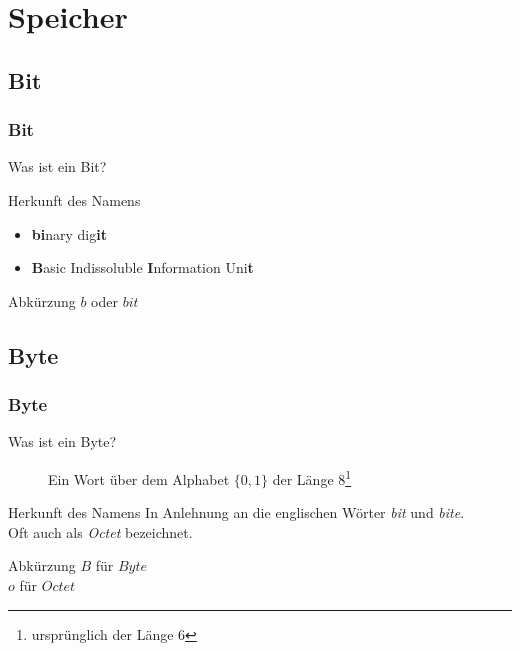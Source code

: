 \section{Speicher}
\subsection{Bit}
\begin{frame}
	\frametitle{Bit}
	\begin{description}
		\item[Was ist ein Bit?] 
	\end{description}
	\pause
	\pause
	\begin{block}{Herkunft des Namens}
		\begin{itemize}
			\item \textbf{bi}nary dig\textbf{it}
			\item \textbf{B}asic Indissoluble \textbf{I}nformation Uni\textbf{t}
		\end{itemize}
	\end{block}
	\pause
	\begin{block}{Abkürzung}
		$b$ oder $bit$
	\end{block}
\end{frame}

\subsection{Byte}
\begin{frame}
	\frametitle{Byte}
	\begin{description}
		\item[Was ist ein Byte?] Ein Wort über dem Alphabet $\{0,1\}$ der Länge 8\footnote{ursprünglich der Länge 6}
	\end{description}
	\pause
	\begin{block}{Herkunft des Namens}
		In Anlehnung an die englischen Wörter \textit{bit} und \textit{bite}.\\
		Oft auch als \textit{Octet} bezeichnet.
	\end{block}
	\pause
	\begin{block}{Abkürzung}
		$B$ für $Byte$\\
		$o$ für $Octet$\\
	\end{block}
\end{frame}

